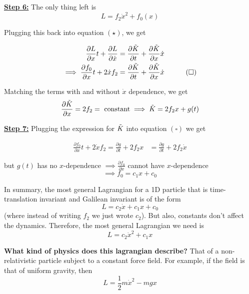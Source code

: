 \documentclass[11pt]{article}
\begin{document}
\vskip 0.5cm
\textbf{\underline{Step 6:}} The only thing left is 
\[ L = f_2 \dot{x}^2 + f_0(x) \]

Plugging this back into equation $(\star)$, we get 

\begin{align*}
  \frac{\partial L}{\partial x} t + \frac{\partial L}{\partial \dot{x}} &= \frac{\partial \Tilde{K}}{\partial t} + \frac{\partial \Tilde{K}}{\partial x} \dot{x} \\
  \implies \frac{\partial f_0}{\partial x} t + 2 \dot{x} f_2 &= \frac{\partial \Tilde{K}}{\partial t} + \frac{\partial \Tilde{K}}{\partial x} \dot{x} \;\;\;\;\;\;\;\;\;\;\; (\square)
\end{align*}

Matching the terms with and without $\dot{x}$ dependence, we get
\begin{align*}
   \frac{\partial \Tilde{K}}{\partial x} = 2f_2 = \text{ constant} \implies \Tilde{K} = 2f_2 x + g(t)
\end{align*}

\vskip 0.5cm
\textbf{\underline{Step 7:}} 
Plugging the expression for $\Tilde{K}$ into equation $(\square)$ we get 

\begin{align*}
  \frac{\partial f_0}{\partial x} t + 2\dot{x}f_2 = \frac{\partial g}{\partial t} + 2f_2 x &= \frac{\partial g}{\partial t} + 2f_2 \dot{x} 
\end{align*}

but $g(t)$ has no $x$-dependence $\implies \frac{\partial f_0}{\partial x}$ cannot have $x$-dependence 
\[ \implies f_0 = c_1x + c_0 \]

\begin{bluebox}
  In summary, the most general Lagrangian for a 1D particle that is time-translation invariant and Galilean invariant is of the form 
  \[ L = c_2 \dot{x} + c_1 x + c_0 \]
  (where instead of writing $f_2$ we just wrote $c_2$). But also, constants don't affect the dynamics. Therefore, the most general Lagrangian we need is 
  \[ L = c_2 \dot{x}^2 + c_1 x \]
\end{bluebox}

\begin{redbox}
  \textbf{What kind of physics does this lagrangian describe?} 
  \vskip 0.25cm
  That of a non-relativistic particle subject to a constant force field. For example, if the field is that of uniform gravity, then 
  \[ L = \frac{1}{2}m\dot{x}^2 - mgx \]
\end{redbox}
\end{document}
